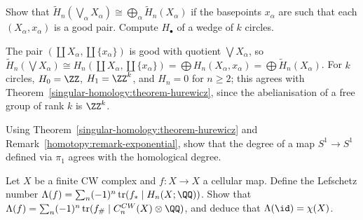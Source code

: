 \begin{exercise}\label{singular-homology:exercise-wedge}
Show that $\tilde{H}_n(\bigvee_\alpha X_\alpha) \cong \bigoplus_\alpha\tilde{H}_n(X_\alpha)$ if the basepoints $x_\alpha$ are such that each $(X_\alpha, x_\alpha)$ is a good pair.
Compute $H_\bullet$ of a wedge of $k$ circles.
\end{exercise}

\begin{solution}
The pair $(\coprod X_\alpha, \coprod\{x_\alpha\})$ is good with quotient $\bigvee X_\alpha$, so
$\tilde{H}_n(\bigvee X_\alpha) \cong H_n(\coprod X_\alpha, \coprod\{x_\alpha\}) = \bigoplus H_n(X_\alpha, x_\alpha) = \bigoplus\tilde{H}_n(X_\alpha)$. For $k$ circles, $H_0 = \ZZ$, $H_1 = \ZZ^k$,
and $H_n = 0$ for $n \geq 2$; this agrees with Theorem~\ref{singular-homology:theorem-hurewicz}, since the abelianisation of a free group of rank $k$ is $\ZZ^k$.
\end{solution}

\begin{exercise}\label{singular-homology:exercise-degree-comparison}
Using Theorem~\ref{singular-homology:theorem-hurewicz} and Remark~\ref{homotopy:remark-exponential}, show that the degree of a map $S^1 \to S^1$ defined via $\pi_1$
agrees with the homological degree.
\end{exercise}

\begin{exercise}\label{singular-homology:exercise-lefschetz}
Let $X$ be a finite CW complex and $f \colon X \to X$ a cellular map. Define the Lefschetz number $\Lambda(f) = \sum_n(-1)^n\operatorname{tr}(f_* \mid H_n(X; \QQ))$. Show that
$\Lambda(f) = \sum_n (-1)^n \operatorname{tr}(f_\# \mid C^{CW}_n(X) \otimes \QQ)$, and deduce that $\Lambda(\id) = \chi(X)$.
\end{exercise}

